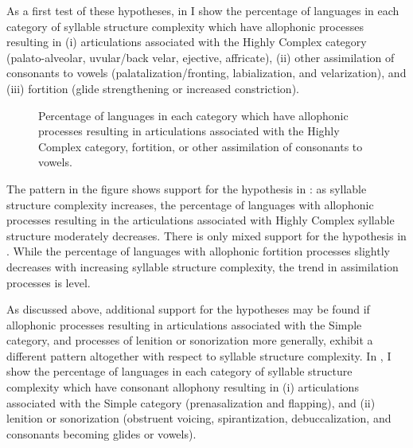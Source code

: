   As a first test of these hypotheses, in  I show the percentage of languages in each category of syllable structure complexity which have allophonic processes resulting in (i) articulations associated with the Highly Complex category (palato-alveolar, uvular/back velar, ejective, affricate), (ii) other assimilation of consonants to vowels (palatalization/fronting, labialization, and velarization), and (iii) fortition (glide strengthening or increased constriction).

\begin{figure}
\caption{\label{fig:7.2}Percentage of languages in each category which have allophonic processes resulting in articulations associated with the Highly Complex category, fortition, or other assimilation of consonants to vowels.}
\end{figure}

  The pattern in the figure shows support for the hypothesis in : as syllable structure complexity increases, the percentage of languages with allophonic processes resulting in the articulations associated with Highly Complex syllable structure moderately decreases. There is only mixed support for the hypothesis in . While the percentage of languages with allophonic fortition processes slightly decreases with increasing syllable structure complexity, the trend in assimilation processes is level.

  As discussed above, additional support for the hypotheses may be found if allophonic processes resulting in articulations associated with the Simple category, and processes of lenition or sonorization more generally, exhibit a different pattern altogether with respect to syllable structure complexity. In , I show the percentage of languages in each category of syllable structure complexity which have consonant allophony resulting in (i) articulations associated with the Simple category (prenasalization and flapping), and (ii) lenition or sonorization (obstruent voicing, spirantization, debuccalization, and consonants becoming glides or vowels).

